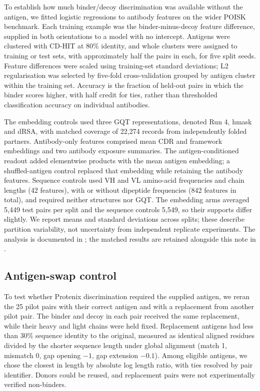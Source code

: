 \documentclass[11pt,a4paper]{article}
\begin{document}
To establish how much binder/decoy discrimination was available without the antigen, we fitted logistic regressions to antibody features on the wider POISK benchmark.
Each training example was the binder-minus-decoy feature difference, supplied in both orientations to a model with no intercept.
Antigens were clustered with CD-HIT at 80\% identity, and whole clusters were assigned to training or test sets, with approximately half the pairs in each, for five split seeds.
Feature differences were scaled using training-set standard deviations; L2 regularisation was selected by five-fold cross-validation grouped by antigen cluster within the training set.
Accuracy is the fraction of held-out pairs in which the binder scores higher, with half credit for ties, rather than thresholded classification accuracy on individual antibodies.

The embedding controls used three GQT representations, denoted Run 4, hmask and dRSA, with matched coverage of 22,274 records from independently folded partners.
Antibody-only features comprised mean CDR and framework embeddings and two antibody exposure summaries.
The antigen-conditioned readout added elementwise products with the mean antigen embedding; a shuffled-antigen control replaced that embedding while retaining the antibody features.
Sequence controls used VH and VL amino-acid frequencies and chain lengths (42 features), with or without dipeptide frequencies (842 features in total), and required neither structures nor GQT.
The embedding arms averaged 5,449 test pairs per split and the sequence controls 5,549, so their supports differ slightly.
We report means and standard deviations across splits; these describe partition variability, not uncertainty from independent replicate experiments.
The analysis is documented in ; the matched results are retained alongside this note in .

\subsection{Antigen-swap control}
\label{sec:swap-methods}

To test whether Protenix discrimination required the supplied antigen, we reran the 25 pilot pairs with their correct antigen and with a replacement from another pilot pair.
The binder and decoy in each pair received the same replacement, while their heavy and light chains were held fixed.
Replacement antigens had less than 30\% sequence identity to the original, measured as identical aligned residues divided by the shorter sequence length under global alignment (match 1, mismatch 0, gap opening $-1$, gap extension $-0.1$).
Among eligible antigens, we chose the closest in length by absolute log length ratio, with ties resolved by pair identifier.
Donors could be reused, and replacement pairs were not experimentally verified non-binders.
\end{document}
